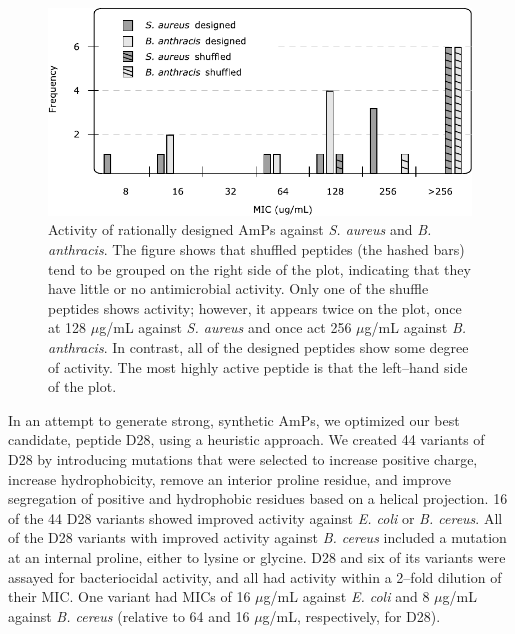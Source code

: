         \begin{figure}[ptb]
        \centering
        \includegraphics{Body/Images-chap2/barActivity.pdf}
        \caption[Activity of rationally designed AmPs against
        \emph{S. aureus} and \emph{B. anthracis}]{
            Activity of rationally designed AmPs against
        \emph{S. aureus} and \emph{B. anthracis}.  The figure shows
        that shuffled peptides (the hashed bars) tend to be grouped
        on the right side of the plot, indicating that they have
        little or no antimicrobial activity.  Only one of the
        shuffle peptides shows activity; however, it appears
        twice on the plot, once  at 128 $\mu$g/mL against
        \emph{S. aureus} and once act 256  $\mu$g/mL against \emph{B.
        anthracis}.  In contrast, all of the designed peptides show
        some degree of activity.  The most highly active peptide is
        that the left--hand side of the plot.
        }
        \label{fig:barActivity}
        \end{figure}

In an attempt to generate strong, synthetic AmPs, we
    optimized our best candidate, peptide D28, using
    a heuristic approach.  We created 44 variants of
    D28 by introducing mutations that were selected to
    increase positive charge, increase hydrophobicity,
    remove an interior proline residue, and improve
    segregation of positive and hydrophobic residues
    based on a helical projection.  16 of the 44 D28
    variants showed improved activity against \emph{E. coli}
    or \emph{B. cereus}.  All of the D28 variants with
    improved activity against \emph{B. cereus} included
    a mutation at an internal proline, either to
    lysine or glycine.  D28 and six of its variants
    were assayed for bacteriocidal activity, and
    all had activity within a 2--fold dilution of
    their MIC\@.  One variant had MICs of 16 $\mu$g/mL
    against \emph{E. coli} and 8 $\mu$g/mL against \emph{B. cereus}
    (relative to 64 and 16 $\mu$g/mL, respectively, for
    D28).

